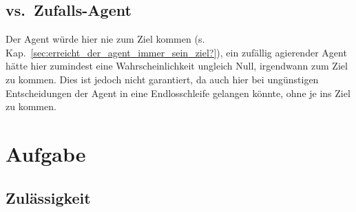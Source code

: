 \documentclass[a4paper,draft=false,oneside,12pt,ngerman]{scrreprt}
\begin{document}
\section{vs.\ Zufalls-Agent}
\label{sec:vs._zufalls-agent}

\begin{center}
\vspace{0.4cm}
\end{center}

Der Agent würde hier nie zum Ziel kommen (s.
Kap.~\ref{sec:erreicht_der_agent_immer_sein_ziel?}), ein zufällig agierender Agent
hätte hier zumindest eine Wahrscheinlichkeit ungleich Null, irgendwann zum Ziel
zu kommen. Dies ist jedoch nicht garantiert, da auch hier bei ungünstigen
Entscheidungen der Agent in eine Endlosschleife gelangen könnte, ohne je ins
Ziel zu kommen.

\chapter{Aufgabe}
\label{chp:aufgabe}

\section{Zulässigkeit}
\label{sec:zulaessigkeit}
\end{document}
